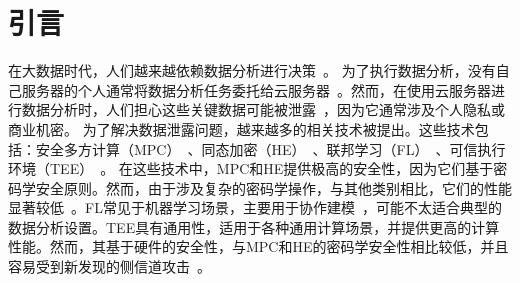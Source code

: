 \section{引言}
在大数据时代，人们越来越依赖数据分析进行决策~\cite{albright2020business}。
为了执行数据分析，没有自己服务器的个人通常将数据分析任务委托给云服务器~\cite{sandhu2021big}。然而，在使用云服务器进行数据分析时，人们担心这些关键数据可能被泄露~\cite{purohit2013data}，因为它通常涉及个人隐私或商业机密。
为了解决数据泄露问题，越来越多的相关技术被提出。这些技术包括：安全多方计算（MPC）~\cite{lindell2020secure,patra2021aby2,dalskov2022fast}、同态加密（HE）~\cite{marcolla2022survey,lu2021pegasus,bossuat2021efficient}、联邦学习（FL）~\cite{li2021survey,bonawitz2017practical,shayan2020biscotti}、可信执行环境（TEE）~\cite{zheng2021survey,tsai2017graphene,priebe2018enclavedb}。
在这些技术中，MPC和HE提供极高的安全性，因为它们基于密码学安全原则。然而，由于涉及复杂的密码学操作，与其他类别相比，它们的性能显著较低~\cite{alaya2020homomorphic,evans2018pragmatic}。FL常见于机器学习场景，主要用于协作建模~\cite{li2021survey}，可能不太适合典型的数据分析设置。TEE具有通用性，适用于各种通用计算场景，并提供更高的计算性能。然而，其基于硬件的安全性，与MPC和HE的密码学安全性相比较低，并且容易受到新发现的侧信道攻击~\cite{nilsson2020survey}。

